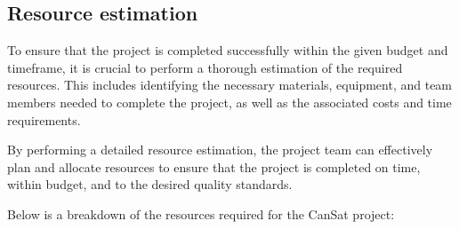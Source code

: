 \subsection{Resource estimation}
To ensure that the project is completed successfully within the given budget and timeframe, it is crucial to perform a thorough estimation of the required resources. This includes identifying the necessary materials, equipment, and team members needed to complete the project, as well as the associated costs and time requirements. 

By performing a detailed resource estimation, the project team can effectively plan and allocate resources to ensure that the project is completed on time, within budget, and to the desired quality standards. 

Below is a breakdown of the resources required for the CanSat project:
